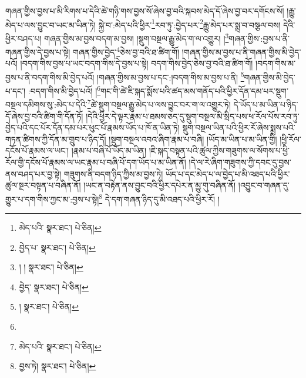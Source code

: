 གཞན་གྱིས་བྱས་པ་མི་རིགས་པ་དེའི་ཚེ་གཉི་གས་བྱས་སོ་ཞེས་བྱ་བའི་སྐབས་མེད་དོ་ཞེས་བྱ་བར་དགོངས་སོ། །རྒྱུ་མེད་པ་ལས་བྱུང་བ་ཡང་མ་ཡིན་ཏེ། སྐྱེ་བ་:མེད་པའི་ཕྱིར་\footnote{མེད་པའི་  སྣར་ཐང་།  པེ་ཅིན། }རབ་ཏུ་:བྱེད་པར་\footnote{བྱེད་པ་  སྣར་ཐང་།  པེ་ཅིན། }རྒྱུ་མེད་པར་སྨྲ་བ་བསྩལ་བས། དེའི་ཕྱིར་བཤད་པ། གཞན་གྱིས་མ་བྱས་བདག་མ་བྱས། །སྡུག་བསྔལ་རྒྱུ་མེད་ག་ལ་འགྱུར། །\footnote{། །   སྣར་ཐང་།  པེ་ཅིན། }གཞན་གྱིས་:བྱས་པ་ནི་གཞན་གྱིས་དེ་བྱས་པ་སྟེ། གཞན་གྱིས་བྱེད་\footnote{བྱེད་  སྣར་ཐང་།  པེ་ཅིན། }ཅེས་བྱ་བའི་ཐ་ཚིག་གོ། །གཞན་གྱིས་མ་བྱས་པ་ནི་གཞན་གྱིས་མི་བྱེད་པའོ། །བདག་གིས་བྱས་པ་ཡང་བདག་གིས་དེ་བྱས་པ་སྟེ། བདག་གིས་བྱེད་ཅེས་བྱ་བའི་ཐ་ཚིག་གོ། །བདག་གིས་མ་བྱས་པ་ནི་བདག་གིས་མི་བྱེད་པའོ། །གཞན་གྱིས་མ་བྱས་པ་དང་:།བདག་གིས་མ་བྱས་པ་ནི། \footnote{།   སྣར་ཐང་།  པེ་ཅིན། }གཞན་གྱིས་མི་བྱེད་པ་དང་། :བདག་གིས་མི་བྱེད་པའོ། །\footnote{}གང་གི་ཚེ་ཇི་སྐད་སྨོས་པའི་ཚད་མས་གནོད་པའི་ཕྱིར་དོན་དམ་པར་སྡུག་བསྔལ་དམིགས་སུ་:མེད་པ་དེའི་\footnote{མེད་པའི་  སྣར་ཐང་།  པེ་ཅིན། }ཚེ་སྡུག་བསྔལ་རྒྱུ་མེད་པ་ལས་བྱུང་བར་ག་ལ་འགྱུར་ཏེ། དེ་ཡོད་པ་མ་ཡིན་པ་ཉིད་དོ་ཞེས་བྱ་བའི་ཚིག་གི་དོན་ཏོ། །དེའི་ཕྱིར་དེ་ལྟར་རྣམ་པ་ཐམས་ཅད་དུ་སྡུག་བསྔལ་མི་སྲིད་པས་ཕ་རོལ་པོས་རབ་ཏུ་བྱེད་པའི་དང་པོར་དོན་དམ་པར་ཕུང་པོ་རྣམས་ཡོད་པ་ཁོ་ན་ཡིན་ཏེ། སྡུག་བསྔལ་ཡིན་པའི་ཕྱིར་རོ་ཞེས་སྨྲས་པའི་གཏན་ཚིགས་ཀྱི་དོན་མ་གྲུབ་པ་ཉིད་དོ། །སྡུག་བསྔལ་འབའ་ཞིག་རྣམ་པ་བཞི། །ཡོད་མ་ཡིན་པ་མ་ཡིན་གྱི། །ཕྱི་རོལ་དངོས་པོ་རྣམས་ལ་ཡང་། །རྣམ་པ་བཞི་པོ་ཡོད་མ་ཡིན། །ཇི་སྐད་བསྟན་པའི་ཚུལ་ཀྱིས་གཟུགས་ལ་སོགས་པ་ཕྱི་རོལ་གྱི་དངོས་པོ་རྣམས་ལ་ཡང་རྣམ་པ་བཞི་པོ་དག་ཡོད་པ་མ་ཡིན་ནོ། །དེ་ལ་རེ་ཞིག་གཟུགས་ཀྱི་དབང་དུ་བྱས་ནས་བཤད་པར་བྱ་སྟེ། གཟུགས་ནི་བདག་ཉིད་ཀྱིས་མ་བྱས་ཏེ། ཡོད་པ་དང་མེད་པ་ལ་བྱེད་པ་མི་འཐད་པའི་ཕྱིར་ཚུལ་སྔར་བསྟན་པ་བཞིན་ནོ། །ཡང་ན་བརྟེན་ནས་བྱུང་བའི་ཕྱིར་དཔེར་ན་མྱུ་གུ་བཞིན་ནོ། །འབྱུང་བ་གཞན་དུ་གྱུར་པ་དག་གིས་ཀྱང་མ་:བྱས་པ་སྟེ།\footnote{བྱས་ཏེ།  སྣར་ཐང་།  པེ་ཅིན། } དེ་དག་གཞན་ཉིད་དུ་མི་འཐད་པའི་ཕྱིར་རོ། །
